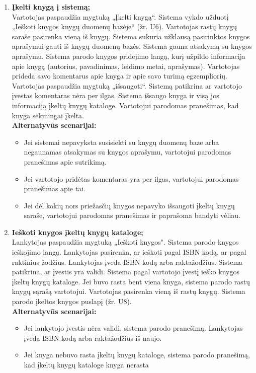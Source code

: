 \documentclass{VUMIFPSkursinis}
\begin{document}
\begin{enumerate}[label=\textbf{U\arabic*.}]
			\item \textbf{Įkelti knygą į sistemą;}\\
				Vartotojas paspaudžia mygtuką „Įkelti knygą“. Sistema vykdo užduotį „Ieškoti knygos knygų duomenų bazėje“ (žr. U6).
				Vartotojas rastų knygų saraše pasirenka vieną iš knygų. Sistema sukuria užklausą pasirinktos knygos aprašymui gauti iš knygų duomenų bazės. 
				Sistema gauna atsakymą su knygos aprašymu. Sistema parodo knygos pridejimo langą, 
				kurį užpildo informacija apie knygą (autorius, pavadinimas, leidimo metai, aprašymas). Vartotojas prideda savo komentarus apie knyga ir apie
				savo turimą egzempliorių. Vartotojas paspaudžia mygtuką „išsaugoti“. Sistemą patikrina ar vartotojo įvestas komentaras nėra per ilgas.
				Sistema išsaugo knyga ir visą jos informaciją įkeltų knygų kataloge. Vartotojui parodomas pranešimas, kad knyga sėkmingai įkelta.\\
				\textbf{Alternatyvūs scenarijai:}
				\begin{itemize}
					\item Jei sistemai nepavyksta susisiekti su knygų duomenų baze arba negaunamas atsakymas su knygos aprašymu, vartotojui parodomas pranešimas apie sutrikimą.
					\item Jei vartotojo pridėtas komentaras yra per ilgas, vartotojui parodomas pranešimas apie tai.
					\item Jei dėl kokių nors priežasčių knygos nepavyko išsaugoti įkeltų knygų saraše, vartotojui parodomas pranešimas ir paprašoma bandyti vėliau.
				\end{itemize}
			\item \textbf{Ieškoti knygos įkeltų knygų kataloge;}\\
				Lankytojas paspaudžia mygtuką „Ieškoti knygos". Sistema parodo knygos ieškojimo langą.
				Lankytojas pasirenka, ar ieškoti pagal ISBN kodą, ar pagal raktinius žodžius. 
				Lankytojas įveda ISBN kodą arba raktažodžius. Sistema patikrina, ar įvestis yra validi.
				Sistema pagal vartotojo įvestį ieško knygos įkeltų knygų kataloge. 
				Jei buvo rasta bent viena knyga, sistema parodo rastų knygų sąrašą vartotojui. Vartotojas pasirenka vieną iš rastų knygų.
				Sistema parodo įkeltos knygos puslapį (žr. U8).\\
				\textbf{Alternatyvūs scenarijai:}
				\begin{itemize}
					\item Jei lankytojo įvestis nėra validi, sistema parodo pranešimą. Lankytojas įveda ISBN kodą arba raktažodžius iš naujo.
					\item Jei knyga nebuvo rasta įkeltų knygų kataloge, sistema parodo pranešimą, kad įkeltų knygų kataloge knyga nerasta 

\end{itemize}
\end{enumerate}
\end{document}
